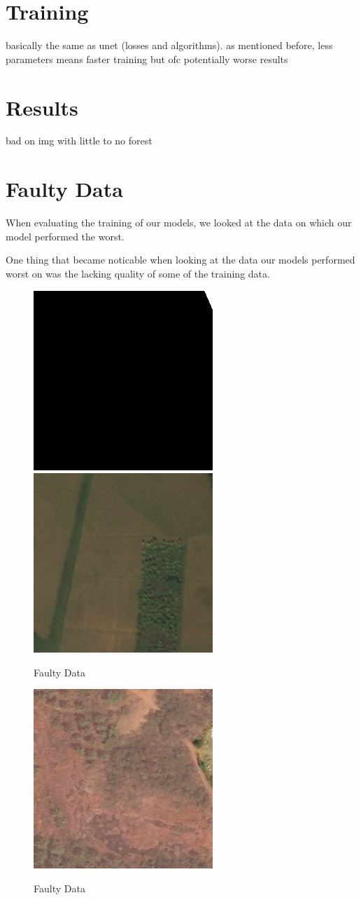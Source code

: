 \section{Training}
basically the same as unet (losses and algorithms). as mentioned before, less parameters means faster training but ofc potentially worse results\\
\section{Results}
bad on img with little to no forest\\
\section{Faulty Data}
When evaluating the training of our models, we looked at the data on which our model performed the worst.

One thing that became noticable when looking at the data our models performed worst on was the lacking quality of some of the training data.
\begin{figure}
  \begin{center}
  \label{badimg}
  \includegraphics[width=.4\linewidth]{images/satellite_images/1_mask}
  \includegraphics[width=.4\linewidth]{images/satellite_images/1_imag}
  \caption{Faulty Data}
  \end{center}
\end{figure}

\begin{figure}
  \begin{center}
  \label{badimg2}
  \includegraphics[width=.4\linewidth]{images/satellite_images/10_overlap}
  \caption{Faulty Data}
  \end{center}
\end{figure}
